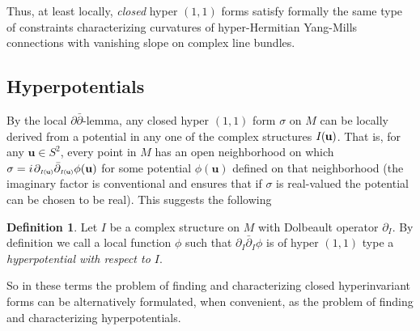 \documentclass[11pt]{amsart}
\theoremstyle{remark}
\theoremstyle{remark}
\theoremstyle{definition}
\newtheorem*{definition}{Definition}
\theoremstyle{definition}
\theoremstyle{definition}
\newcommand{\IU}{I\nhp(\nhp\mathbf{u}\hspace{-0.2pt})} %
\newcommand{\Iu}{\scriptscriptstyle{I\nhp(\nhp\mathbf{u}\hspace{-0.25pt})}} %
\newcommand{\0}{{\scriptstyle 0'}} %
\newcommand{\1}{{\scriptstyle 1'}}
\newcommand{\pt}{\hspace{1pt}} %
\newcommand{\hp}{\hspace{0.5pt}} %
\newcommand{\nhp}{\hspace{-0.5pt}} %
\begin{document}
Thus, at least locally, \textit{closed} hyper $(1,1)$ forms satisfy formally the same type of constraints characterizing curvatures of hyper-Hermitian Yang-Mills connections with vanishing slope on complex line bundles. 


\subsection{Hyperpotentials} \hfill \medskip


By the local $\partial\bar{\partial}$\pt-\hp lemma, any closed hyper $(1,1)$ form $\sigma$ on $M$ can be locally derived from a potential in any one of the complex structures $\IU$. That is,  for any $\mathbf{u} \in S^2$, every point in $M$ has an open neighborhood on which \mbox{$\sigma = i \pt \partial_{\Iu}\bar{\partial}_{\Iu} \phi(\mathbf{u})$} for some potential $\phi(\mathbf{u})$ defined on that neighborhood (the imaginary factor is conventional and ensures that if $\sigma$ is real-valued the potential can be chosen to be real). This suggests the following


\begin{definition}
Let $I$ be a complex structure on $M$ with Dolbeault operator $\partial_I$. By definition we call a local function $\phi$ such that $\partial_I\bar{\partial}_I \phi$ is of hyper $(1,1)$ type a \textit{hyperpotential with respect to $I$}. 
\end{definition}

\noindent So in these terms the problem of finding and characterizing closed hyperinvariant forms can be alternatively formulated, when convenient, as the problem of finding and characterizing hyperpotentials. %
\end{document}
